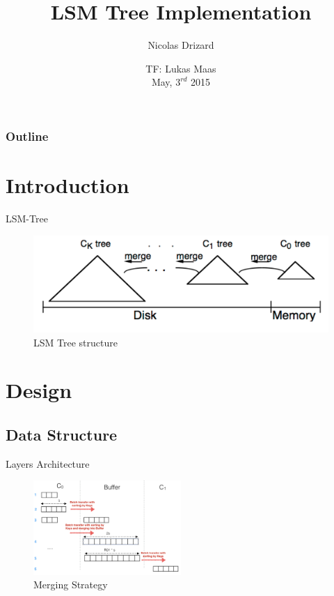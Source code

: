 \documentclass[pdf]{beamer}
\author{Nicolas Drizard}
\date{TF: Lukas Maas \\ May, $3^{rd}$ 2015}
\title{LSM Tree Implementation}
\begin{document}
\begin{frame}
\titlepage
\end{frame}

\begin{frame}
\frametitle{Outline}
\tableofcontents
\end{frame}


\section{Introduction}

\begin{frame}{LSM-Tree}
\begin{figure}
\includegraphics[scale=0.35]{lsm_tree.png}
\caption{LSM Tree structure}
\end{figure}
\end{frame}


\section{Design}

\subsection{Data Structure}

\begin{frame}{Layers Architecture}
\begin{figure}[H]
\begin{center}
    \includegraphics[width=0.5\textwidth]{merge}
    \caption{Merging Strategy}
\end{center}
\end{figure}
\end{frame}
\end{document}
